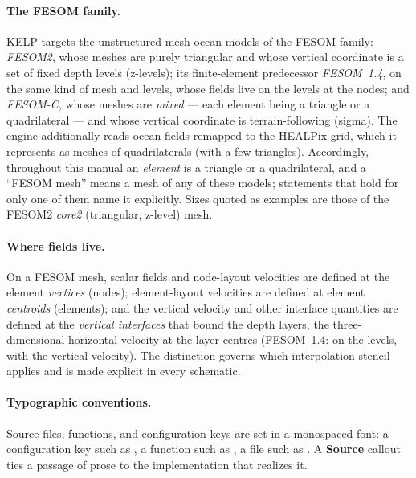 \paragraph{The FESOM family.} \textsf{KELP} targets the unstructured-mesh ocean
models of the FESOM family: \emph{FESOM2}, whose meshes are purely triangular and
whose vertical coordinate is a set of fixed depth levels (z-levels); its finite-element predecessor
\emph{FESOM~1.4}, on the same kind of mesh and levels, whose fields live on the levels at the nodes; and
\emph{FESOM-C}, whose meshes are \emph{mixed} --- each element being a triangle or a
quadrilateral --- and whose vertical coordinate is terrain-following (sigma). The
engine additionally reads ocean fields remapped to the HEALPix grid, which it
represents as meshes of quadrilaterals (with a few triangles). Accordingly, throughout this manual an \emph{element} is a
triangle or a quadrilateral, and a ``FESOM mesh'' means a mesh of any of these models;
statements that hold for only one of them name it explicitly. Sizes quoted as examples are those of the
FESOM2 \emph{core2} (triangular, z-level) mesh.

\paragraph{Where fields live.} On a FESOM mesh, scalar fields and node-layout
velocities are defined at the element \emph{vertices} (nodes); element-layout
velocities are defined at element \emph{centroids} (elements); and the vertical
velocity and other interface quantities are defined at the \emph{vertical
interfaces} that bound the depth layers, the three-dimensional horizontal velocity at the layer centres
(FESOM~1.4: on the levels, with the vertical velocity). The distinction governs which
interpolation stencil applies and is made explicit in every schematic.

\paragraph{Typographic conventions.} Source files, functions, and configuration
keys are set in a monospaced font: a configuration key such as ,
a function such as , a file such as
. A \textbf{Source} callout ties a passage of
prose to the implementation that realizes it.
